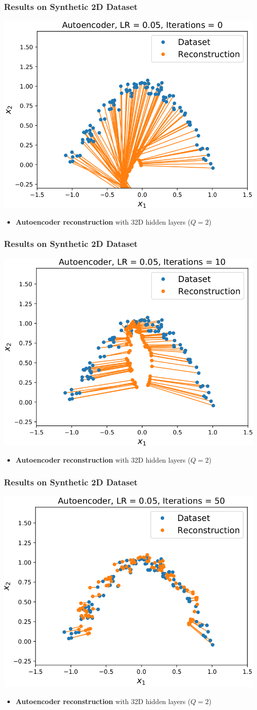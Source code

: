 \documentclass[10pt,aspectratio=169]{beamer}
\begin{document}
\begin{frame}
  \frametitle{Results on Synthetic 2D Dataset}
\begin{center}
\includegraphics[width=.5\textwidth]{images/s28}
\end{center}
\small{
\begin{itemize}
\item \textbf{Autoencoder reconstruction} with 32D hidden layers ($Q=2$)
\end{itemize}
}
\end{frame}

\begin{frame}
  \frametitle{Results on Synthetic 2D Dataset}
\begin{center}
\includegraphics[width=.5\textwidth]{images/s29}
\end{center}
\small{
\begin{itemize}
\item \textbf{Autoencoder reconstruction} with 32D hidden layers ($Q=2$)
\end{itemize}
}
\end{frame}

\begin{frame}
  \frametitle{Results on Synthetic 2D Dataset}
\begin{center}
\includegraphics[width=.5\textwidth]{images/s30}
\end{center}
\small{
\begin{itemize}
\item \textbf{Autoencoder reconstruction} with 32D hidden layers ($Q=2$)
\end{itemize}
}
\end{frame}
\end{document}
